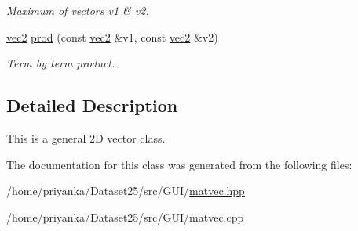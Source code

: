\begin{DoxyCompactItemize}
\begin{DoxyCompactList}\small\item\em \-Maximum of vectors v1 \& v2. \end{DoxyCompactList}\item 
\hypertarget{classutil_1_1math_1_1vec2_a9a7afb1a742384c7a7801658736f8264}{\hyperlink{classutil_1_1math_1_1vec2}{vec2} \hyperlink{classutil_1_1math_1_1vec2_a9a7afb1a742384c7a7801658736f8264}{prod} (const \hyperlink{classutil_1_1math_1_1vec2}{vec2} \&v1, const \hyperlink{classutil_1_1math_1_1vec2}{vec2} \&v2)}\label{classutil_1_1math_1_1vec2_a9a7afb1a742384c7a7801658736f8264}

\begin{DoxyCompactList}\small\item\em \-Term by term product. \end{DoxyCompactList}\end{DoxyCompactItemize}


\subsection{\-Detailed \-Description}
\-This is a general 2\-D vector class. 

\-The documentation for this class was generated from the following files\-:\begin{DoxyCompactItemize}
\item 
/home/priyanka/\-Dataset25/src/\-G\-U\-I/\hyperlink{matvec_8hpp}{matvec.\-hpp}\item 
/home/priyanka/\-Dataset25/src/\-G\-U\-I/matvec.\-cpp\end{DoxyCompactItemize}
